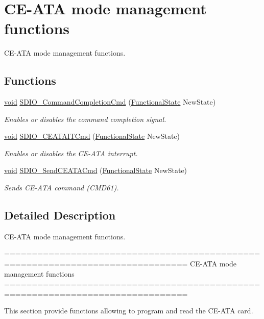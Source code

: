 \hypertarget{group___s_d_i_o___group5}{\section{C\-E-\/\-A\-T\-A mode management functions}
\label{group___s_d_i_o___group5}
}


C\-E-\/\-A\-T\-A mode management functions.  


\subsection*{Functions}
\begin{DoxyCompactItemize}
\item 
\hyperlink{group___n_a_m_e_ga18028b8badbf1ea7e704ccac3c488e82}{void} \hyperlink{group___s_d_i_o___group5_ga1bbe98c629812bc62121d9c8b2c5e21b}{S\-D\-I\-O\-\_\-\-Command\-Completion\-Cmd} (\hyperlink{group___exported__types_gac9a7e9a35d2513ec15c3b537aaa4fba1}{Functional\-State} New\-State)
\begin{DoxyCompactList}\small\item\em Enables or disables the command completion signal. \end{DoxyCompactList}\item 
\hyperlink{group___n_a_m_e_ga18028b8badbf1ea7e704ccac3c488e82}{void} \hyperlink{group___s_d_i_o___group5_gab44b8cbc21be000a291563076159503b}{S\-D\-I\-O\-\_\-\-C\-E\-A\-T\-A\-I\-T\-Cmd} (\hyperlink{group___exported__types_gac9a7e9a35d2513ec15c3b537aaa4fba1}{Functional\-State} New\-State)
\begin{DoxyCompactList}\small\item\em Enables or disables the C\-E-\/\-A\-T\-A interrupt. \end{DoxyCompactList}\item 
\hyperlink{group___n_a_m_e_ga18028b8badbf1ea7e704ccac3c488e82}{void} \hyperlink{group___s_d_i_o___group5_ga8dc7f17804bdb745b42f6647c8487b4c}{S\-D\-I\-O\-\_\-\-Send\-C\-E\-A\-T\-A\-Cmd} (\hyperlink{group___exported__types_gac9a7e9a35d2513ec15c3b537aaa4fba1}{Functional\-State} New\-State)
\begin{DoxyCompactList}\small\item\em Sends C\-E-\/\-A\-T\-A command (C\-M\-D61). \end{DoxyCompactList}\end{DoxyCompactItemize}


\subsection{Detailed Description}
C\-E-\/\-A\-T\-A mode management functions. \begin{DoxyVerb} ===============================================================================
              CE-ATA mode management functions
 ===============================================================================  

  This section provide functions allowing to program and read the CE-ATA card.\end{DoxyVerb}
 

